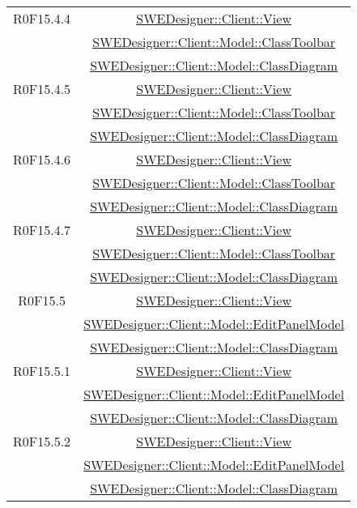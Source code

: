 \documentclass[../SpecificaTecnica.tex]{subfiles}
\begin{document}
\begin{longtable}{|c|c|}
		R0F15.4.4 & \hyperlink{SWEDesigner::Client::View}{SWEDesigner::Client::View}\\& \hyperlink{SWEDesigner::Client::Model::ClassToolbar}{SWEDesigner::Client::Model::ClassToolbar}\\& \hyperlink{SWEDesigner::Client::Model::ClassDiagram}{SWEDesigner::Client::Model::ClassDiagram}\\\hline
		R0F15.4.5 & \hyperlink{SWEDesigner::Client::View}{SWEDesigner::Client::View}\\& \hyperlink{SWEDesigner::Client::Model::ClassToolbar}{SWEDesigner::Client::Model::ClassToolbar}\\& \hyperlink{SWEDesigner::Client::Model::ClassDiagram}{SWEDesigner::Client::Model::ClassDiagram}\\\hline
		R0F15.4.6 & \hyperlink{SWEDesigner::Client::View}{SWEDesigner::Client::View}\\& \hyperlink{SWEDesigner::Client::Model::ClassToolbar}{SWEDesigner::Client::Model::ClassToolbar}\\& \hyperlink{SWEDesigner::Client::Model::ClassDiagram}{SWEDesigner::Client::Model::ClassDiagram}\\\hline
		R0F15.4.7 & \hyperlink{SWEDesigner::Client::View}{SWEDesigner::Client::View}\\& \hyperlink{SWEDesigner::Client::Model::ClassToolbar}{SWEDesigner::Client::Model::ClassToolbar}\\& \hyperlink{SWEDesigner::Client::Model::ClassDiagram}{SWEDesigner::Client::Model::ClassDiagram}\\\hline
		R0F15.5 & \hyperlink{SWEDesigner::Client::View}{SWEDesigner::Client::View}\\& \hyperlink{SWEDesigner::Client::Model::EditPanelModel}{SWEDesigner::Client::Model::EditPanelModel}\\& \hyperlink{SWEDesigner::Client::Model::ClassDiagram}{SWEDesigner::Client::Model::ClassDiagram} \\\hline
		R0F15.5.1 & \hyperlink{SWEDesigner::Client::View}{SWEDesigner::Client::View}\\& \hyperlink{SWEDesigner::Client::Model::EditPanelModel}{SWEDesigner::Client::Model::EditPanelModel}\\& \hyperlink{SWEDesigner::Client::Model::ClassDiagram}{SWEDesigner::Client::Model::ClassDiagram} \\\hline
		R0F15.5.2 & \hyperlink{SWEDesigner::Client::View}{SWEDesigner::Client::View}\\& \hyperlink{SWEDesigner::Client::Model::EditPanelModel}{SWEDesigner::Client::Model::EditPanelModel}\\& \hyperlink{SWEDesigner::Client::Model::ClassDiagram}{SWEDesigner::Client::Model::ClassDiagram} \\\hline

\end{longtable}
\end{document}

